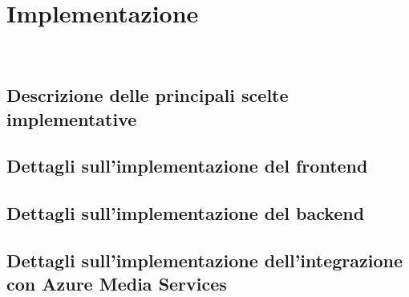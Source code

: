 \chapter{Implementazione}
\label{cap:implementazione}
\\

\section{Descrizione delle principali scelte implementative}

\section{Dettagli sull'implementazione del frontend}

\section{Dettagli sull'implementazione del backend}

\section{Dettagli sull'implementazione dell'integrazione con Azure Media Services}